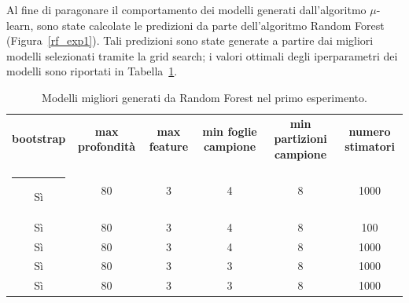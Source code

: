 \documentclass[12pt]{report}
\makeatletter
\theoremstyle{definition}
\newcommand{\thickhline}{%
    \noalign {\ifnum 0=`}\fi \hrule height 1pt
    \futurelet \reserved@a \@xhline
}
\makeatother
\begin{document}
Al fine di paragonare il comportamento dei modelli generati dall'algoritmo $\mu$-learn, sono state calcolate le predizioni da parte dell'algoritmo Random Forest (Figura~\ref{rf_exp1}). Tali predizioni sono state generate a partire dai migliori modelli selezionati tramite la grid search; i valori ottimali degli iperparametri dei modelli sono riportati in Tabella~\ref{models_rf_exp1}.

\begin{table}
\centering
\begin{adjustbox}{max width=\textwidth}
 \begin{tabular}{|c|c|c|c|c|c|} 
 \hline
\textbf{bootstrap} & \textbf{max profondità} & \textbf{max feature} & \textbf{min foglie campione} & \textbf{min partizioni campione} & \textbf{numero stimatori}
\\ [0.5ex] 
 \thickhline
 Sì & 80 & 3 & 4 & 8 & 1000 \\ 
 Sì & 80 & 3 & 4 & 8 & 100 \\ 
 Sì & 80 & 3 & 4 & 8 & 1000 \\ 
 Sì & 80 & 3 & 3 & 8 & 1000 \\ 
 Sì & 80 & 3 & 3 & 8 & 1000 \\ 
 \hline
\end{tabular}
\end{adjustbox}
\caption{Modelli migliori generati da Random Forest nel primo esperimento.}
\label{models_rf_exp1}
\end{table}
\end{document}
